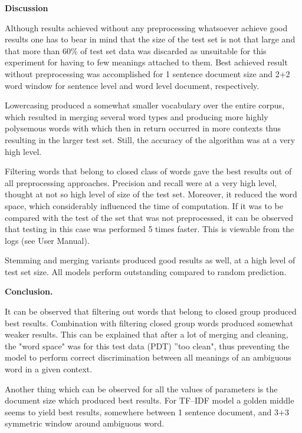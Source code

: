 \vspace{10 mm}
\textbf{Discussion}

Although results achieved without any preprocessing whatsoever achieve good results one has to bear
in mind that the size of the test set is not that large and that more than 60\% of test set data was 
discarded as unsuitable for this experiment for having to few meanings attached to them. Best achieved result without preprocessing was 
accomplished for 1 sentence document size and 2+2 word window for sentence level and word level document, respectively. 

Lowercasing produced a somewhat smaller vocabulary over the entire corpus, which resulted in merging 
several word types and producing more highly polysemous words with which then in return occurred in 
more contexts thus resulting in the larger test set. Still, the accuracy of the algorithm was at a very high 
level.

Filtering words that belong to closed class of words gave the best results out of all preprocessing 
approaches. Precision and recall were at a very high level, thought at not so high level of size of the test set. 
Moreover, it reduced the word space, which considerably influenced the time of computation. If it was to
be compared with the test of the set that was not preprocessed, it can be observed that testing in this 
case was performed 5 times faster. This is viewable from the logs (see User Manual).

Stemming and merging variants produced good results as well, at a high level of test set size. 
All models perform outstanding compared to random prediction. 

\vspace{10 mm}
\textbf{Conclusion.} 

It can be observed that filtering out words that belong to closed group produced 
best results. Combination with filtering closed group words produced somewhat weaker results. This can be explained that after a lot of merging and cleaning, the "word space" was for this test data (PDT) ''too clean", thus preventing the model to perform correct discrimination between all 
meanings of an ambiguous word in a given context.

Another thing which can be observed for all the values of parameters is the document size which 
produced best results. For TF--IDF model a golden middle seems to yield best results, somewhere 
between 1 sentence document, and 3+3 symmetric window around ambiguous word.


